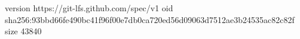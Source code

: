version https://git-lfs.github.com/spec/v1
oid sha256:93bbd66fe490bc41f96f00e7db0ca720ed56d09063d7512ae3b24535ac82c82f
size 43840
